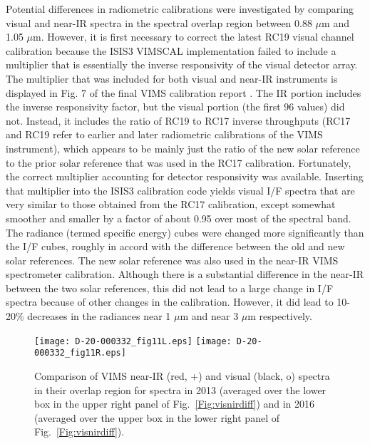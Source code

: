 \documentclass[article,11pt]{emulateapj}
\def\mum{$\mu$m }
\def\mumx{$\mu$m}
\begin{document}
Potential differences in radiometric calibrations were investigated by
comparing visual and near-IR spectra in the spectral overlap region
between 0.88 \mum and 1.05 \mumx.  However, it is first necessary to
correct the latest RC19 visual channel calibration because the ISIS3
VIMSCAL implementation failed to include a multiplier that is
essentially the inverse responsivity of the visual detector array.
The multiplier that was included for both visual and near-IR
instruments is displayed in Fig. 7 of the final VIMS calibration
report \citep{Clark2018cal}. The IR portion includes the inverse
responsivity factor, but the visual portion (the first 96 values) did
not. Instead, it includes the ratio of RC19 to RC17 inverse
throughputs (RC17 and RC19 refer to earlier and later radiometric
calibrations of the VIMS instrument), which appears to be mainly just
the ratio of the new solar reference \citep{Thompson2015sun} to the
prior solar reference \citep{Thekaekara1974} that was used in the RC17
calibration. Fortunately, the correct multiplier accounting for
detector responsivity was available.  Inserting that multiplier into
the ISIS3 calibration code yields visual I/F spectra that are very
similar to those obtained from the RC17 calibration, except somewhat
smoother and smaller by a factor of about 0.95 over most of the
spectral band.  The radiance (termed specific energy) cubes were
changed more significantly than the I/F cubes, roughly in accord with
the difference between the old and new solar references.  The new
solar reference was also used in the near-IR VIMS spectrometer
calibration.  Although there is a substantial difference in the
near-IR between the two solar references, this did not lead to a large
change in I/F spectra because of other changes in the calibration.
However, it did lead to 10-20\% decreases in the radiances near 1 \mum
and near 3 \mum respectively.

\begin{figure*}[!htb]\centering
\texttt{[image: D-20-000332\_fig11L.eps]}
\texttt{[image: D-20-000332\_fig11R.eps]}
\caption{Comparison of VIMS near-IR (red, +) and visual (black, o) 
spectra in their overlap region for spectra in 2013 (averaged over  the lower box in the upper right
panel of Fig.\ \ref{Fig:visnirdiff}) and in 2016 (averaged over the upper box
in the lower right panel of Fig.\ \ref{Fig:visnirdiff}).}
\label{Fig:visnirspec}
\end{figure*}
\end{document}
